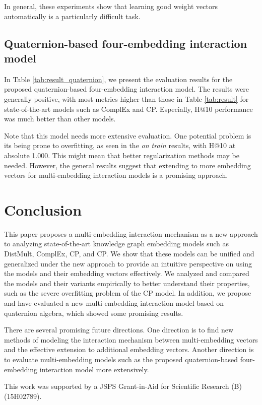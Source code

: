 \documentclass[sigconf,edbt]{acmart-edbt2019}
\begin{document}
In general, these experiments show that learning good weight vectors automatically is a particularly difficult task.

\subsection{Quaternion-based four-embedding interaction model} 
In Table \ref{tab:result_quaternion}, we present the evaluation results for the proposed quaternion-based four-embedding interaction model. The results were generally positive, with most metrics higher than those in Table \ref{tab:result} for state-of-the-art models such as ComplEx and CP. Especially, H@10 performance was much better than other models.

Note that this model needs more extensive evaluation. One potential problem is its being prone to overfitting, as seen in the \textit{on train} results, with H@10 at absolute 1.000. This might mean that better regularization methods may be needed. However, the general results suggest that extending to more embedding vectors for multi-embedding interaction models is a promising approach.

\section{Conclusion}
This paper proposes a multi-embedding interaction mechanism as a new approach to analyzing state-of-the-art knowledge graph embedding models such as DistMult, ComplEx, CP, and CP. We show that these models can be unified and generalized under the new approach to provide an intuitive perspective on using the models and their embedding vectors effectively. We analyzed and compared the models and their variants empirically to better understand their properties, such as the severe overfitting problem of the CP model. In addition, we propose and have evaluated a new multi-embedding interaction model based on quaternion algebra, which showed some promising results.

There are several promising future directions. One direction is to find new methods of modeling the interaction mechanism between multi-embedding vectors and the effective extension to additional embedding vectors. Another direction is to evaluate multi-embedding models such as the proposed quaternion-based four-embedding interaction model more extensively.

\begin{acks}
This work was supported by a JSPS Grant-in-Aid for Scientific Research (B) (15H02789).
\end{acks}
\end{document}
